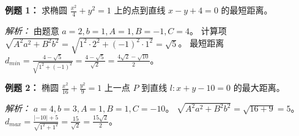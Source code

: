 \begin{examplebox}
\textbf{例题 1：} 求椭圆 $\frac{x^2}{4} + y^2 = 1$ 上的点到直线 $x - y + 4 = 0$ 的最短距离。

\textit{解析：} 
由题意 $a=2, b=1, A=1, B=-1, C=4$。
计算项 $\sqrt{A^2a^2 + B^2b^2} = \sqrt{1^2 \cdot 2^2 + (-1)^2 \cdot 1^2} = \sqrt{5}$。
最短距离 $d_{min} = \frac{4 - \sqrt{5}}{\sqrt{1^2 + (-1)^2}} = \frac{4 - \sqrt{5}}{\sqrt{2}} = \frac{4\sqrt{2} - \sqrt{10}}{2}$。

\textbf{例题 2：} 椭圆 $\frac{x^2}{16} + \frac{y^2}{9} = 1$ 上一点 $P$ 到直线 $l: x + y - 10 = 0$ 的最大距离。

\textit{解析：}
$a=4, b=3, A=1, B=1, C=-10$。
$\sqrt{A^2a^2 + B^2b^2} = \sqrt{16 + 9} = 5$。
$d_{max} = \frac{|-10| + 5}{\sqrt{1^2 + 1^2}} = \frac{15}{\sqrt{2}} = \frac{15\sqrt{2}}{2}$。
\end{examplebox}